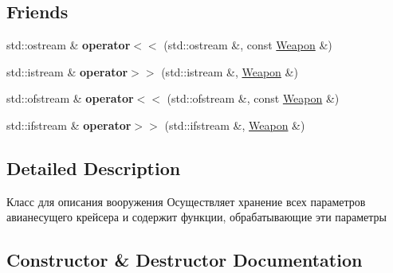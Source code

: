 \subsection*{Friends}
\begin{DoxyCompactItemize}
\item 
\mbox{\label{class_aircraft_carrier_group_1_1_weapon_a6e3f0c651bfbec897325114a9e590373}} 
std\+::ostream \& {\bfseries operator$<$$<$} (std\+::ostream \&, const \mbox{\hyperlink{class_aircraft_carrier_group_1_1_weapon}{Weapon}} \&)
\item 
\mbox{\label{class_aircraft_carrier_group_1_1_weapon_a9a96630ba95fdb0cc6f7b16766081d5c}} 
std\+::istream \& {\bfseries operator$>$$>$} (std\+::istream \&, \mbox{\hyperlink{class_aircraft_carrier_group_1_1_weapon}{Weapon}} \&)
\item 
\mbox{\label{class_aircraft_carrier_group_1_1_weapon_adaef3dde16ced500764bc14a0ddca762}} 
std\+::ofstream \& {\bfseries operator$<$$<$} (std\+::ofstream \&, const \mbox{\hyperlink{class_aircraft_carrier_group_1_1_weapon}{Weapon}} \&)
\item 
\mbox{\label{class_aircraft_carrier_group_1_1_weapon_ad3aa1264af343d372f10374b56344fd6}} 
std\+::ifstream \& {\bfseries operator$>$$>$} (std\+::ifstream \&, \mbox{\hyperlink{class_aircraft_carrier_group_1_1_weapon}{Weapon}} \&)
\end{DoxyCompactItemize}


\subsection{Detailed Description}
Класс для описания вооружения  Осуществляет хранение всех параметров авианесущего крейсера и содержит функции, обрабатывающие эти параметры 

\subsection{Constructor \& Destructor Documentation}
\mbox{\label{class_aircraft_carrier_group_1_1_weapon_a873b32cd3111fc6106d7f13eb4c17e83}} 
